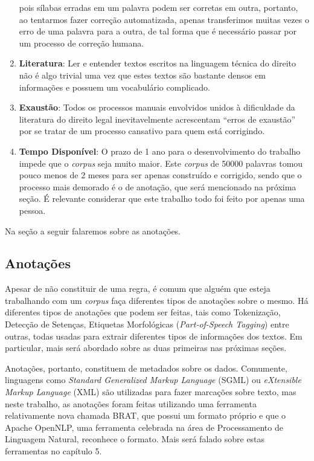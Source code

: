 \documentclass[11pt]{report}
\newcommand{\quotes}[1]{``#1''}
\begin{document}
\begin{enumerate}[label=\textbf{\arabic*.}]
  pois sílabas erradas em um palavra podem ser corretas em outra, portanto, ao tentarmos fazer correção automatizada, apenas transferimos muitas vezes o erro de uma palavra
  para a outra, de tal forma que é necessário passar por um processo de correção humana.
  \item \textbf{Literatura}: Ler e entender textos escritos na linguagem técnica do direito não é algo trivial uma vez que estes textos são bastante densos em informações e
  possuem um vocabulário complicado.
  \item \textbf{Exaustão}: Todos os processos manuais envolvidos unidos à dificuldade da literatura do direito legal inevitavelmente acrescentam \quotes{erros de exaustão}
  por se tratar de um processo cansativo para quem está corrigindo.
  \item \textbf{Tempo Disponível}: O prazo de 1 ano para o desenvolvimento do trabalho impede que o \textit{corpus} seja muito maior. Este \textit{corpus} de 50000 palavras tomou pouco menos de 2 meses
  para ser apenas construído e corrigido, sendo que o processo mais demorado é o de anotação, que será mencionado na próxima seção. É relevante considerar que este trabalho
  todo foi feito por apenas uma pessoa.
\end{enumerate}

Na seção a seguir falaremos sobre as anotações.

\subsection{Anotações}

\indent\indent Apesar de não constituir de uma regra, é comum que alguém que esteja trabalhando com um \textit{corpus} faça diferentes tipos de anotações sobre o mesmo.
Há diferentes tipos de anotações que podem ser feitas, tais como Tokenização, Detecção de Setenças, Etiquetas Morfológicas (\textit{Part-of-Speech Tagging}) entre outras, todas
usadas para extrair diferentes tipos de informações dos textos. Em particular, mais será abordado sobre as duas primeiras nas próximas seções.

Anotações, portanto, constituem de metadados sobre os dados. Comumente, linguagens como \textit{Standard Generalized Markup Language} (SGML) ou
\textit{eXtensible Markup Language} (XML) são utilizadas para fazer marcações sobre texto, mas
neste trabalho, as anotações foram feitas utilizando uma ferramenta relativamente nova chamada BRAT, que possui um
formato próprio e que o Apache OpenNLP, uma ferramenta celebrada na área de Processamento de Linguagem Natural, reconhece o formato.
Mais será falado sobre estas ferramentas no capítulo 5.
\end{document}
